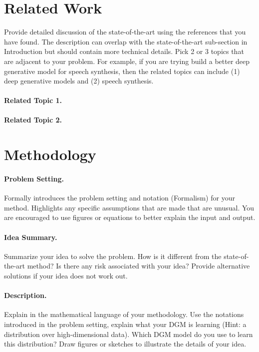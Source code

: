\documentclass{article}
\begin{document}
\section{Related Work}
Provide detailed discussion of the  state-of-the-art using the references that you have found. The description can overlap with  the state-of-the-art sub-section in Introduction but should contain more technical details. Pick 2 or 3 topics that are adjacent to your problem. For example, if you are trying build a better deep generative model for speech synthesis, then the related topics can include (1) deep generative models and (2) speech synthesis.
\paragraph{Related Topic 1.}

\paragraph{Related Topic 2.}

\section{Methodology}

\paragraph{Problem Setting.}
Formally introduces the problem setting and notation (Formalism) for your method. Highlights any specific assumptions that are made that are unusual. You are encouraged to use figures or equations to better explain  the input and output.

\paragraph{Idea Summary.}
Summarize your idea to solve the problem.  How is it different from the state-of-the-art method?  Is there any risk associated with your idea? Provide alternative solutions if your idea does not work out.

\paragraph{Description.}
Explain in the mathematical language of your methodology. Use the notations introduced in the problem setting, explain what your DGM is learning (Hint: a distribution over high-dimensional data). Which DGM model do you use to learn this distribution?    Draw figures or sketches to  illustrate the details of your idea. 
\end{document}
